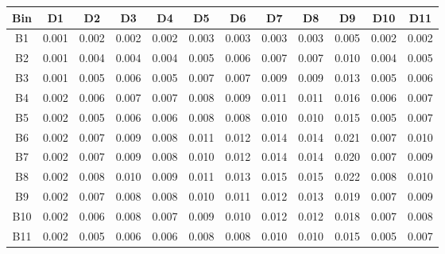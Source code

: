 \begin{tabular}{c@{~~~}c@{~~}c@{~~}c@{~~}c@{~~}c@{~~}c@{~~}c@{~~}c@{~~}c@{~~}c@{~~}c}
\hline
 \hline
Bin	& D1 & D2 & D3 & D4 & D5 & D6 & D7 & D8 & D9 & D10 & D11 \\
\hline
B1	&  0.001 &  0.002 &  0.002 &  0.002 &  0.003 &  0.003 &  0.003 &  0.003 &  0.005 &  0.002 &  0.002 \\
B2	&  0.001 &  0.004 &  0.004 &  0.004 &  0.005 &  0.006 &  0.007 &  0.007 &  0.010 &  0.004 &  0.005 \\
B3	&  0.001 &  0.005 &  0.006 &  0.005 &  0.007 &  0.007 &  0.009 &  0.009 &  0.013 &  0.005 &  0.006 \\
B4	&  0.002 &  0.006 &  0.007 &  0.007 &  0.008 &  0.009 &  0.011 &  0.011 &  0.016 &  0.006 &  0.007 \\
B5	&  0.002 &  0.005 &  0.006 &  0.006 &  0.008 &  0.008 &  0.010 &  0.010 &  0.015 &  0.005 &  0.007 \\
B6	&  0.002 &  0.007 &  0.009 &  0.008 &  0.011 &  0.012 &  0.014 &  0.014 &  0.021 &  0.007 &  0.010 \\
B7	&  0.002 &  0.007 &  0.009 &  0.008 &  0.010 &  0.012 &  0.014 &  0.014 &  0.020 &  0.007 &  0.009 \\
B8	&  0.002 &  0.008 &  0.010 &  0.009 &  0.011 &  0.013 &  0.015 &  0.015 &  0.022 &  0.008 &  0.010 \\
B9	&  0.002 &  0.007 &  0.008 &  0.008 &  0.010 &  0.011 &  0.012 &  0.013 &  0.019 &  0.007 &  0.009 \\
B10	&  0.002 &  0.006 &  0.008 &  0.007 &  0.009 &  0.010 &  0.012 &  0.012 &  0.018 &  0.007 &  0.008 \\
B11	&  0.002 &  0.005 &  0.006 &  0.006 &  0.008 &  0.008 &  0.010 &  0.010 &  0.015 &  0.005 &  0.007 \\
\hline
 \hline
\end{tabular}
